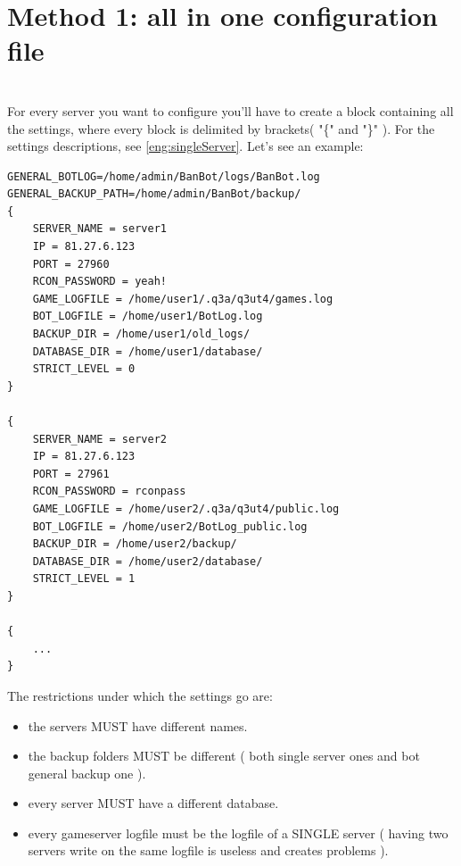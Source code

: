 \documentclass[a4paper]{article}
\begin{document}
\chapter{\textbf{Method 1: all in one configuration file}}\\
For every server you want to configure you'll have to create a block containing all the settings, where every block is delimited by brackets( "\{" and "\}" ).
For the settings descriptions, see \ref{eng:singleServer}.
Let's see an example:
\begin{lstlisting}
GENERAL_BOTLOG=/home/admin/BanBot/logs/BanBot.log
GENERAL_BACKUP_PATH=/home/admin/BanBot/backup/
{
	SERVER_NAME = server1
	IP = 81.27.6.123
	PORT = 27960
	RCON_PASSWORD = yeah!
	GAME_LOGFILE = /home/user1/.q3a/q3ut4/games.log
	BOT_LOGFILE = /home/user1/BotLog.log
	BACKUP_DIR = /home/user1/old_logs/
	DATABASE_DIR = /home/user1/database/
	STRICT_LEVEL = 0
}

{
	SERVER_NAME = server2
	IP = 81.27.6.123
	PORT = 27961
	RCON_PASSWORD = rconpass
	GAME_LOGFILE = /home/user2/.q3a/q3ut4/public.log
	BOT_LOGFILE = /home/user2/BotLog_public.log
	BACKUP_DIR = /home/user2/backup/
	DATABASE_DIR = /home/user2/database/
	STRICT_LEVEL = 1
}

{
	...
}
\end{lstlisting}

The restrictions under which the settings go are:
\begin{itemize}
\item the servers MUST have different names.
\item the backup folders MUST be different ( both single server ones and bot general backup one ).
\item every server MUST have a different database.
\item every gameserver logfile must be the logfile of a SINGLE server ( having two servers write on the same logfile is useless and creates problems ).
\end{itemize}
\end{document}
